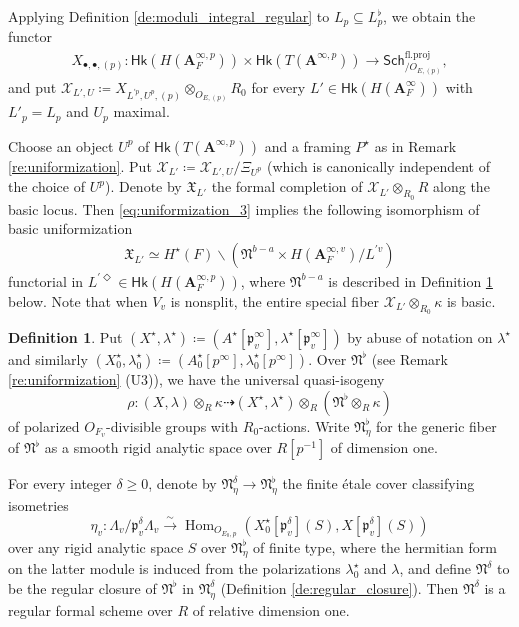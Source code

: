 \documentclass[12pt]{amsart}
\numberwithin{equation}{section}
\theoremstyle{plain}
\theoremstyle{definition}
\newtheorem{definition}[proposition]{Definition}
\theoremstyle{remark}
\renewcommand{\b}[1]{\mathbf{#1}}
\renewcommand{\c}[1]{\mathcal{#1}}
\newcommand{\f}[1]{\mathfrak{#1}}
\renewcommand{\r}[1]{\mathrm{#1}}
\renewcommand{\sf}[1]{\mathsf{#1}}
\renewcommand{\(}{\left(}
\renewcommand{\)}{\right)}
\renewcommand{\geq}{\geqslant}
\newcommand{\bA}{\b A}
\newcommand{\cX}{\c X}
\newcommand{\fN}{\f N}
\newcommand{\fX}{\f X}
\newcommand{\fp}{\f p}
\newcommand{\proj}{\r{fl.proj}}
\newcommand{\Sch}{\sf{Sch}}
\newcommand{\Hk}{\sf{Hk}}
\DeclareMathOperator{\Hom}{Hom}
\begin{document}
Applying Definition \ref{de:moduli_integral_regular} to $L_p\subseteq L^\flat_p$, we obtain the functor
\begin{align*}
X_{\bullet,\bullet,(p)}\colon\Hk(H(\bA_F^{\infty,p}))\times\Hk(T(\bA^{\infty,p}))
\to\Sch^\proj_{/O_{E,(p)}},
\end{align*}
and put $\cX_{L',U}\coloneqq X_{L^{\prime p},U^p,(p)}\otimes_{O_{E,(p)}}R_0$ for every $L'\in\Hk(H(\bA_F^\infty))$ with $L'_p=L_p$ and $U_p$ maximal.


Choose an object $U^p$ of $\Hk(T(\bA^{\infty,p}))$ and a framing $P^\star$ as in Remark \ref{re:uniformization}. Put $\cX_{L'}\coloneqq\cX_{L',U}/\Xi_{U^p}$ (which is canonically independent of the choice of $U^p$). Denote by $\fX_{L'}$ the formal completion of $\cX_{L'}\otimes_{R_0}R$ along the basic locus. Then \eqref{eq:uniformization_3} implies the following isomorphism of basic uniformization
\begin{align}\label{eq:uniformization_4}
\fX_{L'}\simeq H^\star(F)\backslash\(\fN^{b-a}\times H(\bA_F^{\infty,v})/L^{\prime v}\)
\end{align}
functorial in $L^{\prime\Diamond}\in\Hk(H(\bA_F^{\infty,p}))$, where $\fN^{b-a}$ is described in Definition \ref{de:rapoport_zink} below. Note that when $V_v$ is nonsplit, the entire special fiber $\cX_{L'}\otimes_{R_0}\kappa$ is basic.


\begin{definition}\label{de:rapoport_zink}
Put $(X^\star,\lambda^\star)\coloneqq(A^\star[\fp_v^\infty],\lambda^\star[\fp_v^\infty])$ by abuse of notation on $\lambda^\star$ and similarly $(X_0^\star,\lambda_0^\star)\coloneqq(A_0^\star[p^\infty],\lambda_0^\star[p^\infty])$. Over $\fN^\flat$ (see Remark \ref{re:uniformization} (U3)), we have the universal quasi-isogeny
\[
\rho\colon (X,\lambda)\otimes_{R}\kappa \dashrightarrow (X^\star,\lambda^\star)\otimes_R(\fN^\flat\otimes_R\kappa)
\]
of polarized $O_{F_v}$-divisible groups with $R_0$-actions. Write $\fN^\flat_\eta$ for the generic fiber of $\fN^\flat$ as a smooth rigid analytic space over $R[p^{-1}]$ of dimension one.

For every integer $\delta\geq 0$, denote by $\fN^\delta_\eta\to\fN^\flat_\eta$ the finite \'{e}tale cover classifying isometries
\[
\eta_v\colon\Lambda_v/\fp_v^\delta\Lambda_v\xrightarrow\sim\Hom_{O_{E_0,p}}\(X^\star_0[\fp_v^\delta](S), X[\fp_v^\delta](S)\)
\]
over any rigid analytic space $S$ over $\fN^\flat_\eta$ of finite type, where the hermitian form on the latter module is induced from the polarizations $\lambda^\star_0$ and $\lambda$, and define $\fN^\delta$ to be the regular closure of $\fN^\flat$ in $\fN^\delta_\eta$ (Definition \ref{de:regular_closure}). Then $\fN^\delta$ is a regular formal scheme over $R$ of relative dimension one.
\end{definition}
\end{document}
